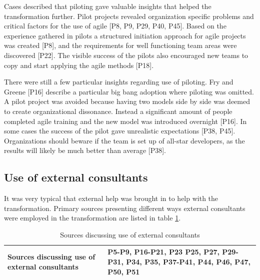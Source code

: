Cases described that piloting gave valuable insights that helped the
transformation further.
Pilot projects revealed organization specific problems and critical factors for
the use of agile [P8, P9, P29, P40, P45].
Based on the experience gathered in pilots a structured initiation approach for
agile projects was created [P8], and the requirements for well functioning team
areas were discovered [P22].
The visible success of the pilots also encouraged new teams to copy and start
applying the agile methods [P18].


There were still a few particular insights regarding use of piloting.
Fry and Greene [P16] describe a particular big bang adoption where piloting was
omitted. A pilot project was avoided because having two models side by side was
deemed to create organizational dissonance. Instead a significant amount of
people completed agile training and the new model was introduced overnight
[P16].
In some cases the success of the pilot gave unrealistic expectations [P38, P45].
Organizations should beware if the team is set up of all-star developers, as
the results will likely be much better than average [P38].


\subsection{Use of external consultants}

It was very typical that external help was brought in to help with the
transformation.
Primary sources presenting different ways external consultants were employed in
the transformation are listed in table \ref{table:transformation_consultants}.

\begin{table}[h]
    \centering
    \begin{tabular}{ >{\raggedright\arraybackslash}p{}
                     >{\raggedright\arraybackslash}p{} }
        \toprule
        Sources discussing use of external consultants  &
                P5-P9, P16-P21, P23 P25, P27, P29-P31,
                P34, P35, P37-P41, P44, P46, P47, P50, P51  \\  %
        \bottomrule
    \end{tabular}
    \caption{Sources discussing use of external consultants}
    \label{table:transformation_consultants}
\end{table}

